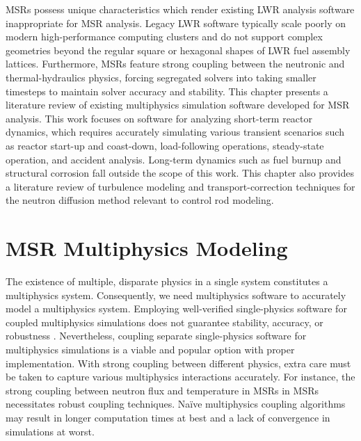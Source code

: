 \glspl{MSR} possess unique characteristics which render existing \gls{LWR}
analysis software inappropriate for \gls{MSR} analysis. Legacy \gls{LWR}
software typically scale poorly on modern high-performance computing
clusters and do not support complex geometries beyond the regular square or hexagonal shapes of
\gls{LWR} fuel assembly lattices. Furthermore, \glspl{MSR} feature strong coupling between the
neutronic and thermal-hydraulics physics, forcing segregated solvers into taking smaller timesteps
to maintain solver accuracy and stability. This chapter presents a literature
review of existing multiphysics simulation software developed for \gls{MSR}
analysis. This work focuses on software for analyzing short-term reactor
dynamics, which requires accurately simulating various transient
scenarios such as reactor start-up and coast-down, load-following operations,
steady-state operation, and accident analysis. Long-term dynamics such as fuel
burnup and structural corrosion fall outside the scope of this work.
This chapter also provides a literature review of turbulence modeling and transport-correction
techniques for the neutron diffusion method relevant to control rod modeling.

\section{MSR Multiphysics Modeling} \label{sec:msr-multiphysics}

The existence of multiple, disparate physics in a single system constitutes a multiphysics system.
Consequently, we need multiphysics software to accurately model a multiphysics system. Employing
well-verified single-physics software for coupled multiphysics simulations does not guarantee
stability, accuracy, or robustness \cite{keyes_multiphysics_2013}. Nevertheless, coupling separate
single-physics software for multiphysics simulations is a viable and popular option with proper
implementation. With strong coupling between different physics, extra care must be
taken to capture various multiphysics interactions accurately. For instance, the strong coupling
between neutron flux and temperature in \glspl{MSR} in \glspl{MSR} necessitates robust coupling
techniques. Na\"ive multiphysics coupling algorithms may result in longer computation times
at best and a lack of convergence in simulations at worst.

